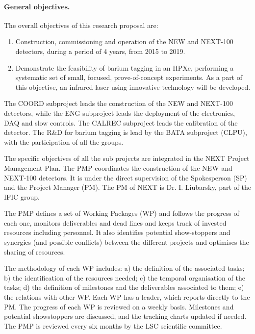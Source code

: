 \paragraph{General objectives.}
The overall objectives of this research proposal are:

\begin{enumerate}
\item Construction, commissioning and operation of the NEW and NEXT-100 detectors, during a period of 4 years, from 2015 to 2019.
\item Demonstrate the feasibility of barium tagging in an HPXe, performing a systematic set of small, focused, prove-of-concept experiments. As a part of this objective, an infrared laser using innovative technology will be developed. 
\end{enumerate}
  
The COORD subproject leads the construction of the NEW and NEXT-100 detectors, while the ENG subproject leads the deployment of the electronics, DAQ and slow controls. The CALREC subproject leads the calibration of the detector. The R\&D for barium tagging is lead by the BATA subproject (CLPU), with the participation of all the groups.   

The specific objectives of all the sub projects are integrated in the NEXT Project Management Plan. The PMP coordinates the construction of the NEW and NEXT-100 detectors. It is under the direct supervision of the Spokesperson (SP) and the Project Manager (PM). The PM of NEXT is Dr. I. Liubarsky, part of the IFIC group. 

The PMP defines a set of Working Packages (WP) and follows the progress of each one, monitors deliverables and dead lines and keeps track of invested resources including personnel. It also identifies potential show-stoppers and synergies (and possible conflicts) between the different projects and optimises the sharing of resources. 



The methodology of each WP includes: a) the definition of the associated tasks; b) the identification of the resources needed; c) the temporal organisation of the tasks; d) the definition of milestones and the deliverables associated to them; e) the relations with other WP. Each WP has a leader, which reports directly to the PM. The progress of each WP is reviewed on a weekly basis. Milestones and potential showstoppers are discussed, and the tracking charts updated if needed. The PMP is reviewed every six months by the LSC scientific committee.  

